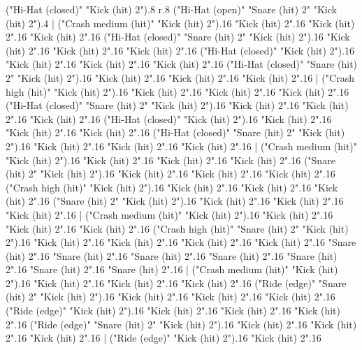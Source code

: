       ("Hi-Hat (closed)" "Kick (hit) 2").8
      r.8
      ("Hi-Hat (open)" "Snare (hit) 2" "Kick (hit) 2").4
    |
      ("Crash medium (hit)" "Kick (hit) 2").16
      "Kick (hit) 2".16
      "Kick (hit) 2".16
      "Kick (hit) 2".16
      ("Hi-Hat (closed)" "Snare (hit) 2" "Kick (hit) 2").16
      "Kick (hit) 2".16
      "Kick (hit) 2".16
      "Kick (hit) 2".16
      ("Hi-Hat (closed)" "Kick (hit) 2").16
      "Kick (hit) 2".16
      "Kick (hit) 2".16
      "Kick (hit) 2".16
      ("Hi-Hat (closed)" "Snare (hit) 2" "Kick (hit) 2").16
      "Kick (hit) 2".16
      "Kick (hit) 2".16
      "Kick (hit) 2".16
    |
      ("Crash high (hit)" "Kick (hit) 2").16
      "Kick (hit) 2".16
      "Kick (hit) 2".16
      "Kick (hit) 2".16
      ("Hi-Hat (closed)" "Snare (hit) 2" "Kick (hit) 2").16
      "Kick (hit) 2".16
      "Kick (hit) 2".16
      "Kick (hit) 2".16
      ("Hi-Hat (closed)" "Kick (hit) 2").16
      "Kick (hit) 2".16
      "Kick (hit) 2".16
      "Kick (hit) 2".16
      ("Hi-Hat (closed)" "Snare (hit) 2" "Kick (hit) 2").16
      "Kick (hit) 2".16
      "Kick (hit) 2".16
      "Kick (hit) 2".16
    |
      ("Crash medium (hit)" "Kick (hit) 2").16
      "Kick (hit) 2".16
      "Kick (hit) 2".16
      "Kick (hit) 2".16
      ("Snare (hit) 2" "Kick (hit) 2").16
      "Kick (hit) 2".16
      "Kick (hit) 2".16
      "Kick (hit) 2".16
      ("Crash high (hit)" "Kick (hit) 2").16
      "Kick (hit) 2".16
      "Kick (hit) 2".16
      "Kick (hit) 2".16
      ("Snare (hit) 2" "Kick (hit) 2").16
      "Kick (hit) 2".16
      "Kick (hit) 2".16
      "Kick (hit) 2".16
    |
      ("Crash medium (hit)" "Kick (hit) 2").16
      "Kick (hit) 2".16
      "Kick (hit) 2".16
      "Kick (hit) 2".16
      ("Crash high (hit)" "Snare (hit) 2" "Kick (hit) 2").16
      "Kick (hit) 2".16
      "Kick (hit) 2".16
      "Kick (hit) 2".16
      "Kick (hit) 2".16
      "Snare (hit) 2".16
      "Snare (hit) 2".16
      "Snare (hit) 2".16
      "Snare (hit) 2".16
      "Snare (hit) 2".16
      "Snare (hit) 2".16
      "Snare (hit) 2".16
    |
      ("Crash medium (hit)" "Kick (hit) 2").16
      "Kick (hit) 2".16
      "Kick (hit) 2".16
      "Kick (hit) 2".16
      ("Ride (edge)" "Snare (hit) 2" "Kick (hit) 2").16
      "Kick (hit) 2".16
      "Kick (hit) 2".16
      "Kick (hit) 2".16
      ("Ride (edge)" "Kick (hit) 2").16
      "Kick (hit) 2".16
      "Kick (hit) 2".16
      "Kick (hit) 2".16
      ("Ride (edge)" "Snare (hit) 2" "Kick (hit) 2").16
      "Kick (hit) 2".16
      "Kick (hit) 2".16
      "Kick (hit) 2".16
    |
      ("Ride (edge)" "Kick (hit) 2").16
      "Kick (hit) 2".16
